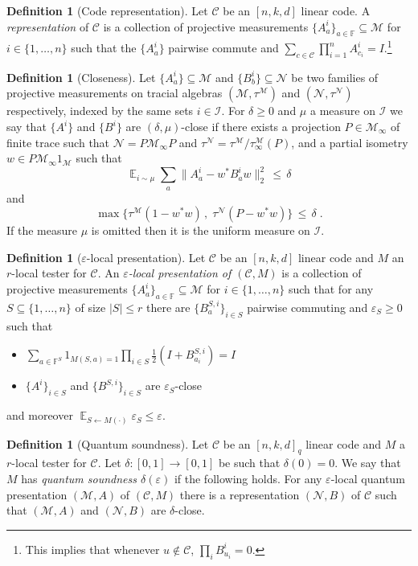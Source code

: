 \documentclass[11pt]{article}
\theoremstyle{definition}
\newtheorem{definition}[theorem]{Definition}
\newcommand{\code}{\mathcal{C}}
\newcommand{\Id}{\ensuremath{I}}
\DeclareMathOperator*{\Expectation}{\mathbb{E}}
\newcommand{\Es}[1]{\Expectation_{#1}}
\newcommand{\field}{\mathbb{F}}
\newcommand{\F}{\ensuremath{\mathbb{F}}}
\newcommand{\mM}{\ensuremath{\mathcal{M}}}
\newcommand{\mI}{\ensuremath{\mathcal{I}}}
\newcommand{\eps}{\varepsilon}
\newcommand{\mN}{\mathcal{N}}
\begin{document}
\begin{definition}[Code representation]
Let $\code$ be an $[n,k,d]$ linear code. A \emph{representation} of $\code$ is a collection of projective measurements $\{A^i_a\}_{a\in\field} \subseteq\mM$ for $i\in\{1,\ldots,n\}$ such that the $\{A^i_a\}$ pairwise commute and $\sum_{c\in\code} \prod_{i=1}^n A^i_{c_i}=\Id$.\footnote{This implies that whenever $u\notin \code$, $\prod_i B^i_{u_i}=0$.} 
\end{definition}

\begin{definition}[Closeness]\label{def:close}
Let $\{A^i_a\}\subseteq \mM$ and $\{B^i_b\}\subseteq \mN$ be two families of projective measurements on  tracial algebras $(\mM,\tau^\mM)$ and $(\mN,\tau^\mN)$ respectively, indexed by the same sets $i\in \mI$. For $\delta\geq0$ and $\mu$ a measure on $\mI$ we say that $\{A^i\}$ and $\{B^i\}$ are $(\delta,\mu)$-close if there exists a projection $P\in\mM_\infty$ of finite trace such that $\mN=P\mM_\infty P$ and $\tau^\mN=\tau^\mM/\tau^\mM_\infty(P)$, and a partial isometry $w\in P \mM_\infty 1_\mM$ such that 
\[ \Es{i\sim\mu} \sum_a \big\| A^i_a - w^* B^i_a w \big\|_2^2 \,\leq\,\delta\]
and 
\[\max\big\{ \tau^\mM(1-w^*w)\,,\; \tau^\mN(P-w^*w)\big\} \,\leq\, \delta\;.\]
If the measure $\mu$ is omitted then it is the uniform measure on $\mI$.
\end{definition}

\begin{definition}[$\eps$-local presentation]
Let $\code$ be an $[n,k,d]$ linear code and $M$ an $r$-local tester for $\code$. An \emph{$\eps$-local presentation of $(\code,M)$} is a collection of projective measurements $\{A^i_a\}_{a\in\field} \subseteq\mM$ for $i\in\{1,\ldots,n\}$ such that for any $S\subseteq\{1,\ldots,n\}$ of size $|S|\leq r$ there are $\{B^{S,i}_a\}_{i\in S}$ pairwise commuting and $\eps_S\geq 0$ such that 
\begin{itemize}
\item $\sum_{a\in \F^S} 1_{M(S,a)=1} \prod_{i\in S} \frac{1}{2}(\Id+B^{S,i}_{a_i})= \Id$
\item $\{A^i\}_{i\in S}$ and $\{B^{S,i}\}_{i\in S}$ are $\eps_S$-close
\end{itemize} 
and moreover $\Es{S\leftarrow M(\cdot)} \eps_S \leq \eps$. 
\end{definition}


\begin{definition}[Quantum soundness]\label{def:q-sound}
Let $\code$ be an $[n,k,d]_q$ linear code and $M$ a $r$-local tester for $\code$. Let $\delta:[0,1]\to[0,1]$ be such that $\delta(0)=0$. We say that $M$ has \emph{quantum soundness $\delta(\eps)$} if the following holds. For any $\eps$-local quantum presentation $(\mM,A)$ of $(\code,M)$
there is a representation $(\mN,B)$ of $\code$ such that $(\mM,A)$ and $(\mN,B)$ are $\delta$-close. 
\end{definition}
\end{document}
